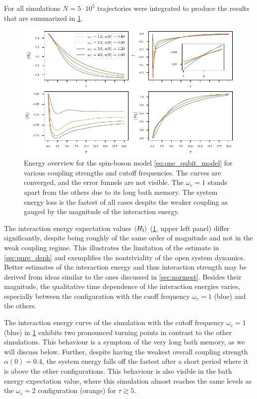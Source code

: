 For all simulations \(N=5\cdot 10^{5}\) trajectories were integrated
to produce the results that are summarized in
\cref{fig:omega_systematics_system}.
\begin{figure}[htp]
  \centering
  \includegraphics{figs/one_bath_syst/omega_energy_overview}
  \caption{\label{fig:omega_systematics_system} Energy overview for
    the spin-boson model \cref{eq:one_qubit_model} for various
    coupling strengths and cutoff frequencies. The curves are
    converged, and the error funnels are not visible. The \(ω_{c}=1\)
    stands apart from the others due to its long bath memory. The
    system energy loss is the fastest of all cases despite the weaker
    coupling as gauged by the magnitude of the interaction energy.}
\end{figure}
The interaction energy expectation values \(\ev{H_{\inter}}\)
(\cref{fig:omega_systematics_system}, upper left panel) differ
significantly, despite being roughly of the same order of magnitude
and not in the weak coupling regime. This illustrates the limitation
of the estimate in \cref{sec:pure_deph} and exemplifies the
nontriviality of the open system dynamics. Better estimates of the
interaction energy and thus interaction strength may be derived from
ideas similar to the ones discussed in \cref{sec:normest}.  Besides
their magnitude, the qualitative time dependence of the interaction
energies varies, especially between the configuration with the cuoff
frequency \(ω_c=1\) (blue) and the others.

The interaction energy curve of the simulation with the cutoff
frequency \(ω_c=1\) (blue) in \cref{fig:omega_systematics_system}
exhibits two pronounced turning points in contrast to the other
simulations. This behaviour is a symptom of the very long bath memory,
as we will discuss below. Further, despite having the weakest overall
coupling strength \(α(0)=0.4\), the system energy falls off the
fastest after a short period where it is above the other
configurations. This behaviour is also visible in the bath energy
expectation value, where this simulation almost reaches the same
levels as the \(ω_c=2\) configuration (orange) for \(τ\gtrsim 5\).

